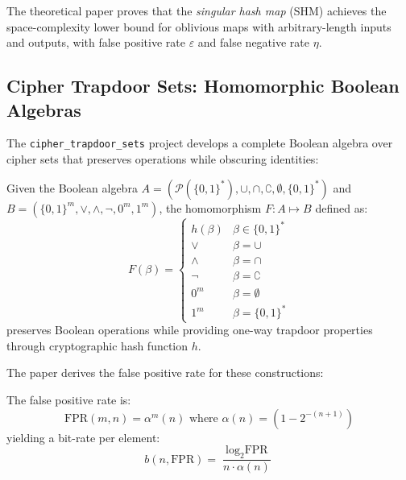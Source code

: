 The theoretical paper proves that the \textit{singular hash map} (SHM) achieves the space-complexity lower bound for oblivious maps with arbitrary-length inputs and outputs, with false positive rate $\varepsilon$ and false negative rate $\eta$.

\subsection{Cipher Trapdoor Sets: Homomorphic Boolean Algebras}

The \texttt{cipher\_trapdoor\_sets} project develops a complete Boolean algebra over cipher sets that preserves operations while obscuring identities:

\begin{theorem}
Given the Boolean algebra $A = (\mathcal{P}(\{0,1\}^*), \cup, \cap, \complement, \emptyset, \{0,1\}^*)$ and $B = (\{0,1\}^m, \lor, \land, \neg, 0^m, 1^m)$, the homomorphism $F: A \mapsto B$ defined as:
\begin{equation}
F(\beta) = \begin{cases}
    h(\beta) & \beta \in \{0,1\}^* \\
    \lor & \beta = \cup \\
    \land & \beta = \cap \\
    \neg & \beta = \complement \\
    0^m & \beta = \emptyset \\
    1^m & \beta = \{0,1\}^*
\end{cases}
\end{equation}
preserves Boolean operations while providing one-way trapdoor properties through cryptographic hash function $h$.
\end{theorem}

The paper derives the false positive rate for these constructions:

\begin{theorem}
The false positive rate is:
\begin{equation}
\text{FPR}(m,n) = \alpha^m(n) \text{ where } \alpha(n) = \left(1 - 2^{-(n+1)}\right)
\end{equation}
yielding a bit-rate per element:
\begin{equation}
b(n,\text{FPR}) = \frac{\log_2 \text{FPR}}{n \cdot \alpha(n)}
\end{equation}
\end{theorem}

